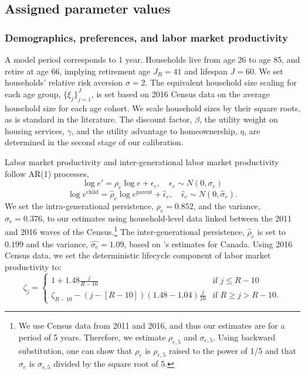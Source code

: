\documentclass[parskip=full]{article}
\begin{document}
\subsection{Assigned parameter values}

\subsubsection{Demographics, preferences, and labor market productivity}
A model period corresponds to 1 year. Households live from age 26 to age 85, and retire at age 66, implying retirement age $J_{R}=41$ and lifespan $J=60$. We set households' relative risk aversion $\sigma=2$. The equivalent household size scaling for each age group, $\{\xi_{j}\}_{j=1}^{J}$, is set based on 2016 Census data on the average household size for each age cohort. We scale household sizes by their square roots, as is standard in the literature. The discount factor, $\beta$, the utility weight on housing services, $\gamma$, and the utility advantage to homeownership, $\eta$, are determined in the second stage of our calibration.

Labor market productivity and inter-generational labor market productivity follow AR(1) processes,
\begin{equation*}
  \log e' = \rho_{e} \log e + \epsilon_{e},\quad \epsilon_{e}\sim N(0,\sigma_{e})
\end{equation*}
\begin{equation*}
\log e^{\text{child}} = \hat{\rho}_{e} \log e^{\text{parent}} + \hat{\epsilon}_{e},\quad \hat{\epsilon}_{e}\sim N(0,\hat{\sigma}_{e}).
\end{equation*}
We set the intra-generational persistence, $\rho_{e}=0.852$, and the variance, $\sigma_{e}=0.376$, to our estimates using household-level data linked between the 2011 and 2016 waves of the Census.\footnote{We use Census data from 2011 and 2016, and thus our estimates are for a period of 5 years. Therefore, we estimate $\rho_{e,5}$ and $\sigma_{e,5}$. Using backward substitution, one can show that $\rho_{e}$ is $\rho_{e,5}$ raised to the power of 1/5 and that $\sigma_{e}$ is $\sigma_{e,5}$ divided by the square root of 5.} The inter-generational persistence, $\hat{\rho}_{e}$ is set to $0.199$ and the variance, $\hat{\sigma_{e}}=1.09$, based on \citet{corak-heisz-1999}'s estimates for Canada. Using 2016 Census data, we set the deterministic lifecycle component of labor market productivity to: 
\begin{equation*}
\zeta_j = \begin{cases}
1+1.48 \frac{j}{R-10} &\text{if $j\leq R-10$}\\
\zeta_{R-10}-\left(j-\left[R-10\right]\right) (1.48-1.04) \frac{j}{10} &\text{if $R \geq j>R-10$}.
\end{cases}
\end{equation*}
\end{document}
